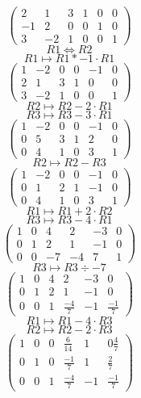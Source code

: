 \documentclass[lineaire_algebra_oplossingen.tex]{subfiles}
\begin{document}
\[
\begin{pmatrix}
2 & 1 & 3 & 1 & 0 & 0\\
-1 & 2 & 0 & 0 & 1 & 0\\
3 & -2 & 1 & 0 & 0 & 1
\end{pmatrix}
\]   
\[ R1 \Leftrightarrow R2 \]
\[ R1 \longmapsto R1 * -1\cdot R1\]
\[
\begin{pmatrix}
1 & -2 & 0 & 0 & -1 & 0\\
2 & 1 & 3 & 1 & 0 & 0\\
3 & -2 & 1 & 0 & 0 & 1
\end{pmatrix}
\]
\[ R2 \longmapsto R2 - 2\cdot R1 \]
\[ R3 \longmapsto R3 - 3\cdot R1 \]
\[
\begin{pmatrix}
1 & -2 & 0 & 0 & -1 & 0\\
0 & 5 & 3 & 1 & 2 & 0\\
0 & 4 & 1 & 0 & 3 & 1
\end{pmatrix}
\]
\[ R2 \longmapsto R2 - R3 \]
\[
\begin{pmatrix}
1 & -2 & 0 & 0 & -1 & 0\\
0 & 1 & 2 & 1 & -1 & 0\\
0 & 4 & 1 & 0 & 3 & 1
\end{pmatrix}
\]
\[ R1 \longmapsto R1 + 2\cdot R2 \]
\[ R3 \longmapsto R3 - 4\cdot R1 \]
\[
\begin{pmatrix}
1 & 0 & 4 & 2 & -3 & 0\\
0 & 1 & 2 & 1 & -1 & 0\\
0 & 0 & -7 & -4 & 7 & 1
\end{pmatrix}
\]
\[ R3 \longmapsto R3 \div -7  \]
\[
\begin{pmatrix}
1 & 0 & 4 & 2 & -3 & 0\\
0 & 1 & 2 & 1 & -1 & 0\\
0 & 0 & 1 & \frac{-4}{7} & -1 & \frac{-1}{7}
\end{pmatrix}
\]
\[ R1 \longmapsto R1  - 4 \cdot R3 \]
\[ R2 \longmapsto R2 - 2 \cdot R3 \]
\[
\begin{pmatrix}
1 & 0 & 0 & \frac{6}{14} & 1 & 0\frac{4}{7}\\
0 & 1 & 0 & \frac{-1}{7} & 1 & \frac{2}{7}\\
0 & 0 & 1 & \frac{-4}{7} & -1 & \frac{-1}{7}
\end{pmatrix}
\]
\end{document}
